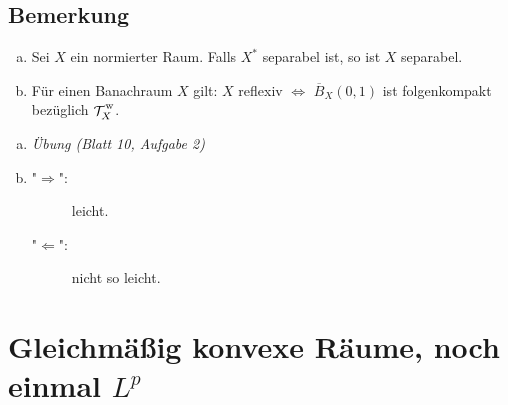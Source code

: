 \subsection[Bemerkung: $X$ separabel, wenn $X^*$ separabel, Reflexiviät von Banachräumen]{Bemerkung} %
\label{sub:519}
\begin{enumerate}[a)]
	\item Sei $X$ ein normierter Raum. Falls $X^*$ separabel ist, so ist $X$ separabel.
	\item Für einen Banachraum $X$ gilt: $X$ reflexiv $\iff$ $\overline{B}_X(0,1)$ ist folgenkompakt bezüglich $\weakT{X}$.
\end{enumerate}
\begin{enumerate}[a)]
	\item \emph{Übung (Blatt 10, Aufgabe 2)}
	\item \begin{description}
		\item["$\Rightarrow$":] leicht.
		\item["$\Leftarrow$":] nicht so leicht. \bewende
	\end{description}
\end{enumerate}
\newpage

\section{Gleichmäßig konvexe Räume, noch einmal $L^p$} %
\label{sec:6}

